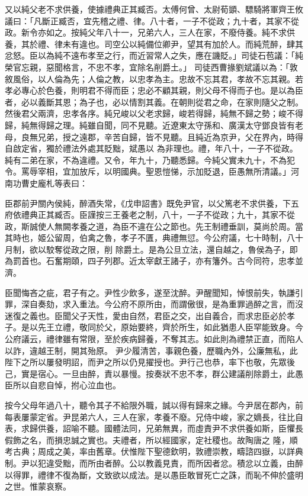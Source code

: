 \begin{pinyinscope}
 又以純父老不求供養，使據禮典正其臧否。太傅何曾、太尉荀顗、驃騎將軍齊王攸議曰：「凡斷正臧否，宜先稽之禮、律。八十者，一子不從政；九十者，其家不從政。新令亦如之。按純父年八十一，兄弟六人，三人在家，不廢侍養。純不求供養，其於禮、律未有違也。司空公以純備位卿尹，望其有加於人。而純荒醉，肆其忿怒。臣以為純不遠布孝至之行，而近習常人之失，應在譏貶。」司徒石苞議：「純榮官忘親，惡聞格言，不忠不孝，宜除名削爵土。」
 司徒西曹掾劉斌議以為：「敦敘風俗，以人倫為先；人倫之教，以忠孝為主。忠故不忘其君，孝故不忘其親。若孝必專心於色養，則明君不得而臣；忠必不顧其親，則父母不得而子也。是以為臣者，必以義斷其恩；為子也，必以情割其義。在朝則從君之命，在家則隨父之制。然後君父兩濟，忠孝各序。純兄峻以父老求歸，峻若得歸，純無不歸之勢；峻不得歸，純無得歸之理。純雖自聞，同不見聽。近遼東太守孫和、廣漢太守鄧良皆有老母，良無兄弟，授之遠郡，辛苦自歸，皆不見聽。且純近為京尹，父在界內，時得自啟定省，獨於禮法外處其貶黜，斌愚以
 為非理也。禮，年八十，一子不從政。純有二弟在家，不為違禮。又令，年九十，乃聽悉歸。今純父實未九十，不為犯令。罵辱宰相，宜加放斥，以明國典。聖恩愷悌，示加貶退，臣愚無所清議。」河南功曹史龐札等表曰：



 臣郡前尹關內侯純，醉酒失常，《戊申詔書》既免尹官，以父篤老不求供養，下五府依禮典正其臧否。臣謹按三王養老之制，八十，一子不從政；九十，其家不從政，斯誠使人無闕孝養之道，為臣不違在公之節也。先王制禮垂訓，莫尚於周。當其時也，姬公留周，伯禽之魯，孝子不匱，典禮無愆。今公府議，七十時制，八十月制，欲以駮奪從政之限，削
 除爵土。是為公旦立法，還自越之，魯侯為子，即為罰首也。石奮期頤，四子列郡。近太宰獻王諸子，亦有籓外。古今同符，忠孝並濟。



 臣聞悔吝之疵，君子有之。尹性少飲多，遂至沈醉。尹醒聞知，悼恨前失，執謙引罪，深自奏劾，求入重法。今公府不原所由，而謂傲很，是為重罪過醉之言，而沒迷復之義也。臣聞父子天性，愛由自然，君臣之交，出自義合，而求忠臣必於孝子。是以先王立禮，敬同於父，原始要終，齊於所生，如此猶患人臣罕能致身。今公府議云，禮律雖有常限，至於疾病歸養，不奪其志。如此則為禮禁正直，而陷人以詐，違越王制，開其殆原。
 尹少履清苦，事親色養，歷職內外，公廉無私，此陛下之所以屢發明詔，而尹之所以仍見擢授也。尹行己也恭，率下也敬，先眾後己，實是宿心。一旦由醉，責以暴慢。按奏狀不忠不孝，群公建議削除爵土，此愚臣所以自悲自悼，拊心泣血也。



 按今父母年過八十，聽令其子不給限外職，誠以得有歸來之緣。今尹居在郡內，前每表屢蒙定省。尹昆弟六人，三人在家，孝養不廢。兄侍中峻，家之嫡長，往比自表，求歸供養，詔喻不聽。國體法同，兄弟無異，而虛責尹不求供養如斯，臣懼長假飾之名，而損忠誠之實也。夫禮者，所以經國家，定社稷也。故陶唐之
 隆，順考古典；周成之美，率由舊章。伏惟陛下聖德欽明，敦禮崇教，疇諮四嶽，以詳典制。尹以犯違受黜，而所由者醉。公以教義見責，而所因者忿。積忿以立義，由醉以得罪，禮律不復為斷，文致欲以成法。是以愚臣敢冒死亡之誅，而恥不伸於盛明之世。惟蒙哀察。




\end{pinyinscope}
